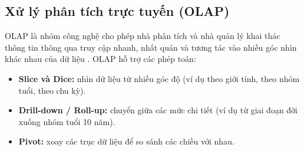 \subsection{Xử lý phân tích trực tuyến (OLAP)}
OLAP là nhóm công nghệ cho phép nhà phân tích và nhà quản lý khai thác thông tin thông qua truy cập nhanh, nhất quán và tương tác vào nhiều góc nhìn khác nhau của dữ liệu \cite{kimball2013,han2012}. OLAP hỗ trợ các phép toán:
\begin{itemize}
\item \textbf{Slice và Dice:} nhìn dữ liệu từ nhiều góc độ (ví dụ theo giới tính, theo nhóm tuổi, theo chu kỳ).
\item \textbf{Drill-down / Roll-up:} chuyển giữa các mức chi tiết (ví dụ từ giai đoạn đời xuống nhóm tuổi 10 năm).
\item \textbf{Pivot:} xoay các trục dữ liệu để so sánh các chiều với nhau.
\end{itemize}

